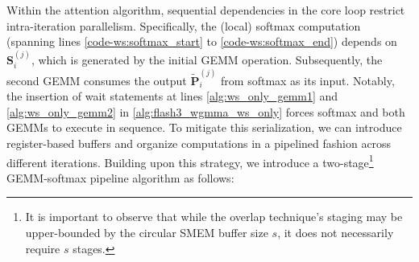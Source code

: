 Within the attention algorithm, sequential dependencies in the core loop restrict intra-iteration parallelism. Specifically, the (local) softmax computation (spanning lines \ref{code-ws:softmax_start} to \ref{code-ws:softmax_end}) depends on $\mathbf{S}_i^{(j)}$, which is generated by the initial GEMM operation. Subsequently, the second GEMM consumes the output $\widetilde{\mathbf{P}}_i^{(j)}$ from softmax as its input. Notably, the insertion of wait statements at lines \ref{alg:ws_only_gemm1} and \ref{alg:ws_only_gemm2} in \cref{alg:flash3_wgmma_ws_only} forces softmax and both GEMMs to execute in sequence. To mitigate this serialization, we can introduce register-based buffers and organize computations in a pipelined fashion across different iterations. Building upon this strategy, we introduce a two-stage\footnote{It is important to observe that while the overlap technique's staging may be upper-bounded by the circular SMEM buffer size $s$, it does not necessarily require $s$ stages.} GEMM-softmax pipeline algorithm as follows:

